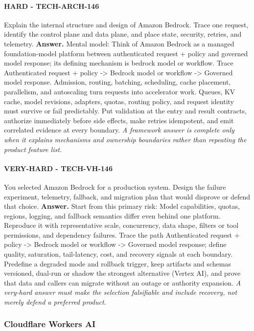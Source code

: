 \paragraph{HARD - TECH-ARCH-146} Explain the internal structure and design of Amazon Bedrock. Trace one request, identify the control plane and data plane, and place state, security, retries, and telemetry.
\textbf{Answer.} Mental model: Think of Amazon Bedrock as a managed foundation-model platform between authenticated request + policy and governed model response; its defining mechanism is bedrock model or workflow. Trace Authenticated request + policy -> Bedrock model or workflow -> Governed model response. Admission, routing, batching, scheduling, cache placement, parallelism, and autoscaling turn requests into accelerator work. Queues, KV cache, model revisions, adapters, quotas, routing policy, and request identity must survive or fail predictably. Put validation at the entry and result contracts, authorize immediately before side effects, make retries idempotent, and emit correlated evidence at every boundary.
\textit{A framework answer is complete only when it explains mechanisms and ownership boundaries rather than repeating the product feature list.}
\paragraph{VERY-HARD - TECH-VH-146} You selected Amazon Bedrock for a production system. Design the failure experiment, telemetry, fallback, and migration plan that would disprove or defend that choice.
\textbf{Answer.} Start from this primary risk: Model capabilities, quotas, regions, logging, and fallback semantics differ even behind one platform. Reproduce it with representative scale, concurrency, data shape, filters or tool permissions, and dependency failures. Trace the path Authenticated request + policy -> Bedrock model or workflow -> Governed model response; define quality, saturation, tail-latency, cost, and recovery signals at each boundary. Predefine a degraded mode and rollback trigger, keep artifacts and schemas versioned, dual-run or shadow the strongest alternative (Vertex AI), and prove that data and callers can migrate without an outage or authority expansion.
\textit{A very-hard answer must make the selection falsifiable and include recovery, not merely defend a preferred product.}
\subsubsection*{Cloudflare Workers AI}
